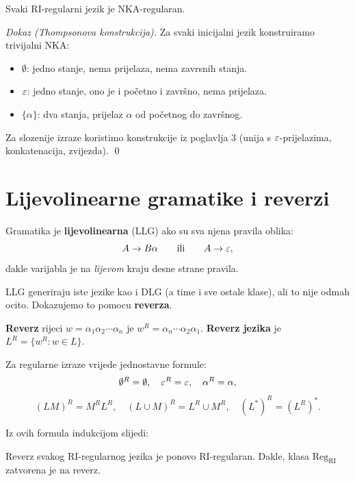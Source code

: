 \begin{propozicija}
Svaki RI-regularni jezik je NKA-regularan.
\end{propozicija}

\textit{Dokaz (Thompsonova konstrukcija).}
Za svaki inicijalni jezik konstruiramo trivijalni NKA:
\begin{itemize}
  \item $\emptyset$: jedno stanje, nema prijelaza, nema zavrsnih stanja.
  \item $\varepsilon$: jedno stanje, ono je i početno i završno, nema prijelaza.
  \item $\{\alpha\}$: dva stanja, prijelaz $\alpha$ od početnog do završnog.
\end{itemize}
Za slozenije izraze koristimo konstrukcije iz poglavlja 3
(unija s $\varepsilon$-prijelazima, konkatenacija, zvijezda). \qed

\section{Lijevolinearne gramatike i reverzi}

\begin{definicija}
Gramatika je \textbf{lijevolinearna} (LLG) ako su sva njena pravila
oblika:
\[
  A \to B\alpha \qquad \text{ili} \qquad A \to \varepsilon,
\]
dakle varijabla je na \emph{lijevom} kraju desne strane pravila.
\end{definicija}

LLG generiraju iste jezike kao i DLG (a time i sve ostale klase),
ali to nije odmah ocito. Dokazujemo to pomocu \textbf{reverza}.

\begin{definicija}[Reverz]
\textbf{Reverz} rijeci $w = \alpha_1 \alpha_2 \cdots \alpha_n$ je
$w^R = \alpha_n \cdots \alpha_2 \alpha_1$.
\textbf{Reverz jezika} je $L^R = \{w^R : w \in L\}$.
\end{definicija}

Za regularne izraze vrijede jednostavne formule:
\[
  \emptyset^R = \emptyset, \quad \varepsilon^R = \varepsilon, \quad \alpha^R = \alpha,
\]
\[
  (LM)^R = M^R L^R, \quad (L \cup M)^R = L^R \cup M^R, \quad (L^*)^R = (L^R)^*.
\]

Iz ovih formula indukcijom slijedi:

\begin{propozicija}
Reverz svakog RI-regularnog jezika je ponovo RI-regularan.
Dakle, klasa $\mathrm{Reg_{RI}}$ zatvorena je na reverz.
\end{propozicija}

